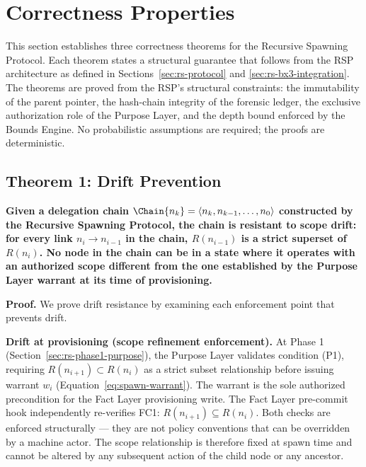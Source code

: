 \section{Correctness Properties}
\label{sec:rs-correctness}

This section establishes three correctness theorems for the Recursive Spawning Protocol. Each theorem states a structural guarantee that follows from the RSP architecture as defined in Sections~\ref{sec:rs-protocol} and \ref{sec:rs-bx3-integration}. The theorems are proved from the RSP's structural constraints: the immutability of the parent pointer, the hash-chain integrity of the forensic ledger, the exclusive authorization role of the Purpose Layer, and the depth bound enforced by the Bounds Engine. No probabilistic assumptions are required; the proofs are deterministic.

\subsection{Theorem 1: Drift Prevention}
\label{sec:rs-thm-drift}

\begin{tcolorbox}[colback=blue!5, colframe=blue, title={Theorem 1 (Drift Prevention)}]
\textbf{Given a delegation chain $\Chain{n_k} = \langle n_k, n_{k-1}, \ldots, n_0 \rangle$ constructed by the Recursive Spawning Protocol, the chain is resistant to scope drift: for every link $n_i \rightarrow n_{i-1}$ in the chain, $R(n_{i-1})$ is a strict superset of $R(n_i)$. No node in the chain can be in a state where it operates with an authorized scope different from the one established by the Purpose Layer warrant at its time of provisioning.}
\end{tcolorbox}

\medskip
\noindent\textbf{Proof.} We prove drift resistance by examining each enforcement point that prevents drift.

\medskip
\noindent\textbf{Drift at provisioning (scope refinement enforcement).} At Phase 1 (Section~\ref{sec:rs-phase1-purpose}), the Purpose Layer validates condition (P1), requiring $R(n_{i+1}) \subset R(n_i)$ as a strict subset relationship before issuing warrant $w_i$ (Equation~\ref{eq:spawn-warrant}). The warrant is the sole authorized precondition for the Fact Layer provisioning write. The Fact Layer pre-commit hook independently re-verifies FC1: $R(n_{i+1}) \subseteq R(n_i)$. Both checks are enforced structurally --- they are not policy conventions that can be overridden by a machine actor. The scope relationship is therefore fixed at spawn time and cannot be altered by any subsequent action of the child node or any ancestor.

